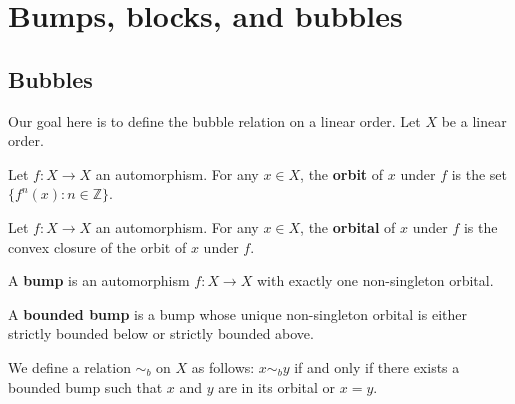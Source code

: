 %
\chapter{Bumps, blocks, and bubbles}
\section*{Bubbles}
Our goal here is to define the bubble relation
on a linear order. Let $X$ be a linear order.

\begin{definition}
    \label{elem_orbit}
    \leanok
Let $f\colon X \to X$ an automorphism.
For any $x\in X$, the \textbf{orbit} of $x$ under $f$
is the set $\{f^n(x) : n \in \mathbb{Z}\}$.
\end{definition}

\begin{definition}
    \label{elem_orbital}
    \leanok
Let $f\colon X \to X$ an automorphism.
For any $x \in X$, the \textbf{orbital} of $x$ under $f$
is the convex closure of the orbit of $x$ under $f$.
\end{definition}

\begin{definition}
    \label{bump}
    \leanok
A \textbf{bump} is an automorphism
$f\colon X \to X$ with exactly one non-singleton orbital.
\end{definition}

\begin{definition}
    \label{boundedBump}
    \leanok
A \textbf{bounded bump} is a bump
whose unique non-singleton orbital
is either strictly bounded below
or strictly bounded above.
\end{definition}

\begin{definition}
    \label{bubbleR}
    \leanok
We define a relation $\sim_b$ on $X$ as follows:
$x \sim_b y$ if and only if there exists a
bounded bump such that $x$ and $y$ are in its
orbital or $x = y$.
\end{definition}


